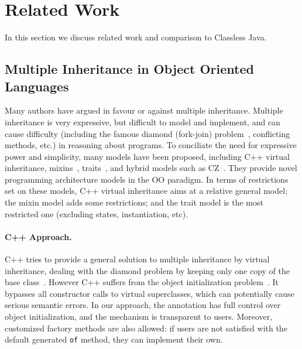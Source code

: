 \section{Related Work}\label{sec:related}
In this section we discuss related work and comparison to Classless Java.



\subsection{Multiple Inheritance in Object Oriented Languages}
Many authors have argued in favour or against multiple inheritance.  Multiple
inheritance is very expressive, but difficult to model and implement, and can
cause difficulty (including the famous diamond (fork-join)
problem~\cite{bracha90mixin,Sak89dis}, conflicting methods, etc.) in reasoning about 
programs. To conciliate the need for expressive power and simplicity, many
models have been proposed, including C++ virtual inheritance,
mixins~\cite{bracha90mixin}, traits~\cite{scharli03traits}, and hybrid models
such as CZ~\cite{malayeri2009cz}.  They provide novel programming architecture
models in the OO paradigm. In terms of restrictions set on these models, C++
virtual inheritance aims at a relative general model; the mixin model adds some
restrictions; and the trait model is the most restricted one (excluding
states, instantiation, etc).

\paragraph{C++ Approach.}
C++ tries to provide a general solution to multiple inheritance by
virtual inheritance, dealing with the diamond problem by keeping only
one copy of the base class~\cite{ellis1990annotated}. However C++
suffers from the object initialization problem~\cite{malayeri2009cz}.
It bypasses all constructor calls to virtual superclasses, which can
potentially cause serious semantic errors. In our approach, the \mixin
annotation has full control over object initialization,
and the mechanism is transparent to users. Moreover, customized factory
methods are also allowed: if users are not satisfied with the default
generated \texttt{of} method, they can implement their own.

